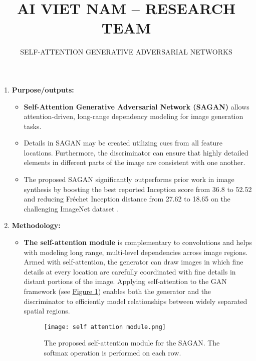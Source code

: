 \documentclass[11pt]{article}
\title{\LARGE AI VIET NAM – RESEARCH TEAM}
\author{\Large SELF-ATTENTION GENERATIVE ADVERSARIAL NETWORKS}
\begin{document}
\maketitle

\begin{enumerate}[\arabic*]
    \item
    \textbf{Purpose/outputs:}
    \begin{itemize}
        \item \textbf{Self-Attention Generative Adversarial Network (SAGAN)} \cite{https://doi.org/10.48550/arxiv.1805.08318} allows attention-driven, long-range dependency modeling for image generation tasks. 
        \item Details in SAGAN may be created utilizing cues from all feature locations. Furthermore, the discriminator can ensure that highly detailed elements in different parts of the image are consistent with one another.
        \item The proposed SAGAN significantly outperforms prior work in image synthesis by boosting the best reported Inception score from 36.8 to 52.52 and reducing Fréchet Inception distance from 27.62 to 18.65 \cite{https://doi.org/10.48550/arxiv.1706.08500} on the challenging ImageNet dataset \cite{5206848}.
    \end{itemize}
        
    \item
    \textbf{Methodology:}
    \begin{itemize}
        \item \textbf{The self-attention module} is complementary to convolutions and helps with modeling long range, multi-level dependencies across image regions. Armed with self-attention, the generator can draw images in which fine details at every location are carefully coordinated with fine details in distant portions of the image. Applying self-attention to the GAN framework (see \hyperref[fig:self attention]{Figure 1}) enables both the generator and the discriminator to efficiently model relationships between widely separated spatial regions. \\
        \begin{figure}
            \centering
            \texttt{[image: self attention module.png]}
            \caption{The proposed self-attention module for the SAGAN. The softmax operation is performed on each row.}
            \label{fig:self attention}
        \end{figure}
        

\end{itemize}
\end{enumerate}
\end{document}
